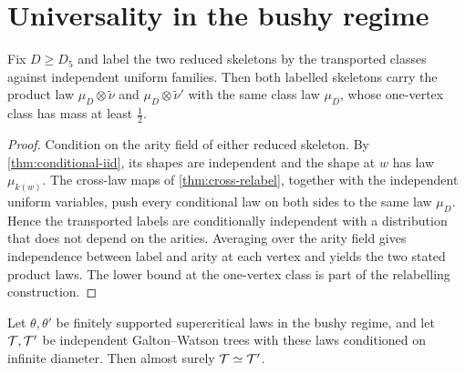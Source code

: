 \section{Universality in the bushy regime}

\begin{proposition}
\label{thm:hairy-cross}
\leanok
Fix $D\geq D_5$ and label the two reduced skeletons by the transported classes against
independent uniform families. Then both labelled skeletons carry the product law
$\mu_D\otimes\widetilde\nu$ and $\mu_D\otimes\widetilde\nu'$ with the same class law $\mu_D$,
whose one-vertex class has mass at least $\tfrac12$.
\end{proposition}

\begin{proof}
\leanok
{}
Condition on the arity field of either reduced skeleton. By \cref{thm:conditional-iid}, its
shapes are independent and the shape at $w$ has law $\mu_{k(w)}$. The cross-law maps of
\cref{thm:cross-relabel}, together with the independent uniform variables, push every conditional
law on both sides to the same law $\mu_D$. Hence the transported labels are conditionally
independent with a distribution that does not depend on the arities. Averaging over the arity
field gives independence between label and arity at each vertex and yields the two stated product
laws. The lower bound at the one-vertex class is part of the relabelling construction.
\end{proof}

\begin{proposition}
\label{thm:hairy-general}
\leanok
{}
Let $\theta,\theta'$ be finitely supported supercritical laws in the bushy regime, and let
$\mathcal{T},\mathcal{T}'$ be independent Galton--Watson trees with these laws conditioned on infinite
diameter. Then almost surely $\mathcal{T}\simeq\mathcal{T}'$.
\end{proposition}

